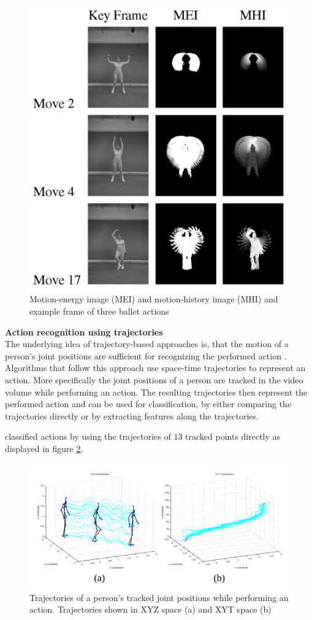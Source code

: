 \begin{figure}[H]
    \centering
    \includegraphics[width=.6\textwidth]{img_conventional/spacetimevolumes_meimhi}
    \caption{Motion-energy image (MEI) and motion-history image (MHI) and example frame of three ballet actions \cite{bobick_recognition_2001}}
    \label{fig:spacetimevolumes_meimhi}
\end{figure}

\textbf{Action recognition using trajectories} \\
The underlying idea of trajectory-based approaches is, that the motion of a person's joint positions are sufficient for recognizing the performed action \cite{johansson_visual_1975}.
Algorithms that follow this approach use space-time trajectories to represent an action.
More specifically the joint positions of a person are tracked in the video volume while performing an action.
The resulting trajectories then represent the performed action and can be used for classification, by either comparing the trajectories directly or by extracting features along the trajectories.

\textcite{sheikh_exploring_2005} classified actions by using the trajectories of $13$ tracked points directly as displayed in figure \ref{fig:trajectories_sheikh}.

\begin{figure}[H]
    \centering
    \includegraphics[width=\textwidth]{img_conventional/trajectories_sheikh}
    \caption{Trajectories of a person's tracked joint positions while performing an action. Trajectories shown in XYZ space (a) and XYT space (b) \cite{sheikh_exploring_2005}}
    \label{fig:trajectories_sheikh}
\end{figure}


